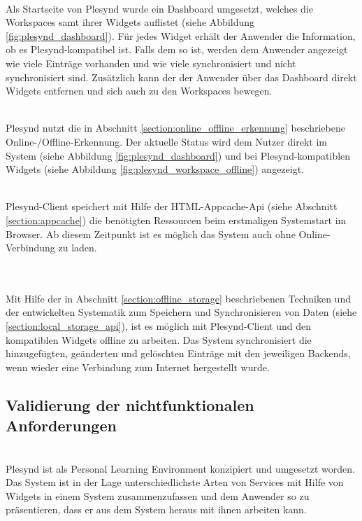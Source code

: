 \textbullet{}  \emph{\requirementDashboard}\\
Als Startseite von Plesynd wurde ein Dashboard umgesetzt, welches die Workspaces samt ihrer Widgets auflistet (siehe Abbildung \ref{fig:plesynd_dashboard}). Für jedes Widget erhält der Anwender die Information, ob es Plesynd-kompatibel ist. Falls dem so ist, werden dem Anwender angezeigt wie viele Einträge vorhanden und wie viele synchronisiert und nicht synchronisiert sind. Zusätzlich kann der der Anwender über das Dashboard direkt Widgets entfernen und sich auch zu den Workspaces bewegen.

\textbullet{}  \emph{\requirementCheckOnlineStatus}\\
Plesynd nutzt die in Abschnitt \ref{section:online_offline_erkennung} beschriebene Online-/Offline-Erkennung. Der aktuelle Status wird dem Nutzer direkt im System (siehe Abbildung \ref{fig:plesynd_dashboard}) und bei Plesynd-kompatiblen Widgets (siehe Abbildung \ref{fig:plesynd_workspace_offline}) angezeigt.

\textbullet{}  \emph{\requirementOfflineStart}\\
Plesynd-Client speichert mit Hilfe der HTML-Appcache-Api (siehe Abschnitt \ref{section:appcache}) die benötigten Ressourcen beim erstmaligen Systemstart im Browser. Ab diesem Zeitpunkt ist es möglich das System auch ohne Online-Verbindung zu laden.

\textbullet{}  \emph{\requirementOfflineWork}\\
\textbullet{}  \emph{\requirementOnlineSync}\\
Mit Hilfe der in Abschnitt \ref{section:offline_storage} beschriebenen Techniken und der entwickelten Systematik zum Speichern und Synchronisieren von Daten (siehe \ref{section:local_storage_api}), ist es möglich mit Plesynd-Client und den kompatiblen Widgets offline zu arbeiten. Das System synchronisiert die hinzugefügten, geänderten und gelöschten Einträge mit den jeweiligen Backends, wenn wieder eine Verbindung zum Internet hergestellt wurde.

\subsection{Validierung der nichtfunktionalen Anforderungen}
\textbullet{}  \emph{\requirementAggregator}\\
Plesynd ist als Personal Learning Environment konzipiert und umgesetzt worden. Das System ist in der Lage unterschiedlichste Arten von Services mit Hilfe von Widgets in einem System zusammenzufassen und dem Anwender so zu präsentieren, dass er aus dem System heraus mit ihnen arbeiten kann.

